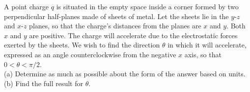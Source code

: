 A point charge $q$ is situated in the empty space inside a corner formed
by two perpendicular half-planes made of sheets of metal. Let the sheets
lie in the $y$-$z$ and $x$-$z$ planes, so that the charge's distances
from the planes are $x$ and $y$. Both $x$ and $y$ are positive. The charge will
accelerate due to the electrostatic forces exerted by the sheets.
We wish to find the direction $\theta$ in which it will accelerate, expressed
as an angle counterclockwise from the negative $x$ axis, so that $0<\theta<\pi/2$.\\
(a) Determine as much as possible about the form of the answer based
on units.\hwendpart
(b) Find the full result for $\theta$.\hwendpart
